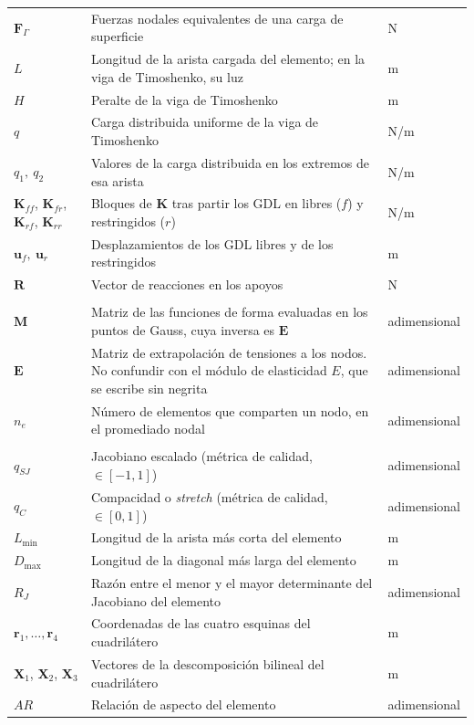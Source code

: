 \begin{longtable}{@{}>{\raggedright\arraybackslash}p{3.0cm}p{7.8cm}p{3.0cm}@{}}
$\bm{F}_\Gamma$ & Fuerzas nodales equivalentes de una carga de superficie & N \\
$L$ & Longitud de la arista cargada del elemento; en la viga de Timoshenko, su luz & m \\
$H$ & Peralte de la viga de Timoshenko & m \\
$q$ & Carga distribuida uniforme de la viga de Timoshenko & N/m \\
$q_1,\ q_2$ & Valores de la carga distribuida en los extremos de esa arista & N/m \\
$\bm{K}_{ff}$, $\bm{K}_{fr}$, $\bm{K}_{rf}$, $\bm{K}_{rr}$ & Bloques de $\bm{K}$ tras partir los GDL en libres ($f$) y restringidos ($r$) & N/m \\
$\bm{u}_f,\ \bm{u}_r$ & Desplazamientos de los GDL libres y de los restringidos & m \\
$\bm{R}$ & Vector de reacciones en los apoyos & N \\
\addlinespace
\multicolumn{3}{@{}l}{\textit{Recuperación de tensiones}} \\
\addlinespace
$\bm{M}$ & Matriz de las funciones de forma evaluadas en los puntos de Gauss, cuya inversa es $\bm{E}$ & adimensional \\
$\bm{E}$ & Matriz de extrapolación de tensiones a los nodos. No confundir con el módulo de elasticidad $E$, que se escribe sin negrita & adimensional \\
$n_e$ & Número de elementos que comparten un nodo, en el promediado nodal & adimensional \\
\addlinespace
\multicolumn{3}{@{}l}{\textit{Calidad geométrica de la malla}} \\
\addlinespace
$q_{SJ}$ & Jacobiano escalado (métrica de calidad, $\in[-1,1]$) & adimensional \\
$q_C$ & Compacidad o \emph{stretch} (métrica de calidad, $\in[0,1]$) & adimensional \\
$L_{\min}$ & Longitud de la arista más corta del elemento & m \\
$D_{\max}$ & Longitud de la diagonal más larga del elemento & m \\
$R_J$ & Razón entre el menor y el mayor determinante del Jacobiano del elemento & adimensional \\
$\bm{r}_1,\dots,\bm{r}_4$ & Coordenadas de las cuatro esquinas del cuadrilátero & m \\
$\bm{X}_1$, $\bm{X}_2$, $\bm{X}_3$ & Vectores de la descomposición bilineal del cuadrilátero & m \\
$AR$ & Relación de aspecto del elemento & adimensional \\

\end{longtable}
